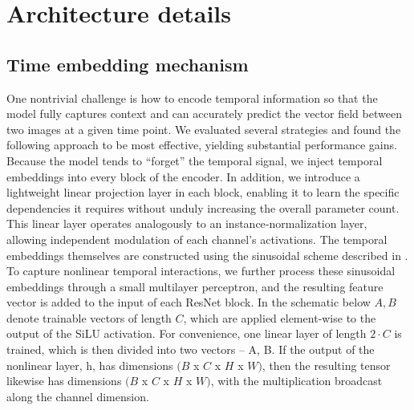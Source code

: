 \documentclass{article}
\begin{document}
\newpage
\section{Architecture details}
\subsection{Time embedding mechanism}
One nontrivial challenge is how to encode temporal information so that the model fully captures context and can accurately predict the vector field between two images at a given time point. We evaluated several strategies and found the following approach to be most effective, yielding substantial performance gains. Because the model tends to “forget” the temporal signal, we inject temporal embeddings into every block of the encoder. In addition, we introduce a lightweight linear projection layer in each block, enabling it to learn the specific dependencies it requires without unduly increasing the overall parameter count. This linear layer operates analogously to an instance‐normalization layer, allowing independent modulation of each channel’s activations. The temporal embeddings themselves are constructed using the sinusoidal scheme described in \citep{vaswani2017attention}. To capture nonlinear temporal interactions, we further process these sinusoidal embeddings through a small multilayer perceptron, and the resulting feature vector is added to the input of each ResNet block. 
In the schematic below $A, B$ denote trainable vectors of length $C$, which are applied element‐wise to the output of the SiLU activation. For convenience, one linear layer of length $2\cdot C$ is trained, which is then divided into two vectors -- A, B. 
If the output of the nonlinear layer,  h, has dimensions $(B$ x $C$ x $H$ x $W)$, then the resulting tensor likewise has dimensions $(B$ x $C$ x $H$ x $W)$, with the multiplication broadcast along the channel dimension.
\end{document}
